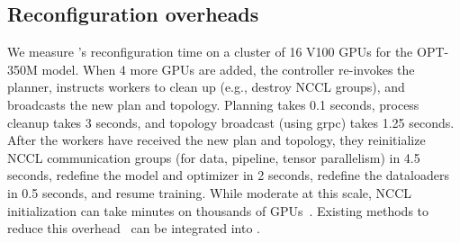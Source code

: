 \subsection{Reconfiguration overheads}

We measure \sailor's reconfiguration time on a cluster of 16 V100 GPUs for the OPT-350M model. When 4 more GPUs are added, the controller re-invokes the planner, instructs workers to clean up (e.g., destroy NCCL groups), and broadcasts the new plan and topology. Planning takes 0.1 seconds, process cleanup takes 3 seconds, and topology broadcast (using grpc) takes 1.25 seconds. After the workers have received the new plan and topology, they reinitialize NCCL communication groups (for data, pipeline, tensor parallelism) in 4.5 seconds, redefine the model and optimizer in 2 seconds, redefine the dataloaders in 0.5 seconds, and resume training. %
While moderate at this scale, NCCL initialization can take minutes on thousands of GPUs~\cite{jiang2024megascale}. Existing methods to reduce this overhead~\cite{jiang2024megascale} can be integrated into \sailor.